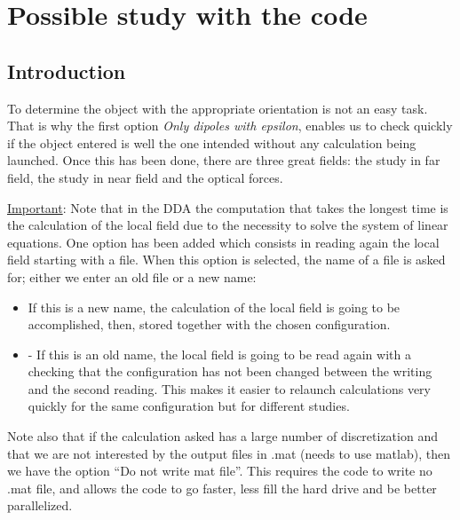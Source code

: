 \chapter{Possible study with the code}\label{chap5}

\minitoc

\section{Introduction}

To determine the object with the appropriate orientation is not an
easy task.  That is why the first option {\it Only dipoles with
  epsilon}, enables us to check quickly if the object entered is well
the one intended without any calculation being launched. Once this has
been done, there are three great fields: the study in far field, the
study in near field and the optical forces.

\vskip10mm

{\underline{Important}}: Note that in the DDA the computation that
takes the longest time is the calculation of the local field due to
the necessity to solve the system of linear equations.  One option has
been added which consists in reading again the local field starting
with a file. When this option is selected, the name of a file is asked
for; either we enter an old file or a new name:

\begin{itemize}
\item If this is a new name, the calculation of the local field is
  going to be accomplished, then, stored together with the chosen
  configuration.
\item - If this is an old name, the local field is going to be read
  again with a checking that the configuration has not been changed
  between the writing and the second reading. This makes it easier to
  relaunch calculations very quickly for the same configuration but
  for different studies.
\end{itemize}


Note also that if the calculation asked has a large number of
discretization and that we are not interested by the output files in
.mat (needs to use matlab), then we have the option ``Do not write mat
file''. This requires the code to write no .mat file, and allows the
code to go faster, less fill the hard drive and be better
parallelized.


